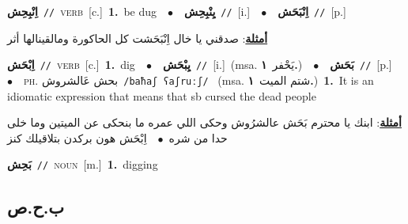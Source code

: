 \documentclass[10pt,a4paper,twoside]{article} %
\begin{document}
\begin{multicols}{2}
{{{{{{{{{{{{\setlength\topsep{0pt}\textbf{\foreignlanguage{arabic}{اِنْبِحِش}}\ {\color{gray}\texttt{//}\color{black}}\ \textsc{verb}\ [c.]\ \textbf{1.}~be dug\ \ $\bullet$\ \ \setlength\topsep{0pt}\textbf{\foreignlanguage{arabic}{يِنْبِحِش}}\ {\color{gray}\texttt{//}\color{black}}\ [i.]\ \ $\bullet$\ \ \setlength\topsep{0pt}\textbf{\foreignlanguage{arabic}{اِنْبَحَش}}\ {\color{gray}\texttt{//}\color{black}}\ [p.]\  \begin{flushright}\color{gray}\foreignlanguage{arabic}{\textbf{\underline{\foreignlanguage{arabic}{أمثلة}}}: صدقني يا خال اِنْبَحَشت كل الحاكورة ومالقينالها أثر}\end{flushright}\color{black}} \vspace{2mm}

{\setlength\topsep{0pt}\textbf{\foreignlanguage{arabic}{اِبْحَش}}\ {\color{gray}\texttt{//}\color{black}}\ \textsc{verb}\ [c.]\ \textbf{1.}~dig\ \ $\bullet$\ \ \setlength\topsep{0pt}\textbf{\foreignlanguage{arabic}{يِبْحَش}}\ {\color{gray}\texttt{//}\color{black}}\ [i.]\ \color{gray}(msa. \foreignlanguage{arabic}{يَحْفر}~\foreignlanguage{arabic}{\textbf{١.}})\color{black}\ \ $\bullet$\ \ \setlength\topsep{0pt}\textbf{\foreignlanguage{arabic}{بَحَش}}\ {\color{gray}\texttt{//}\color{black}}\ [p.]\ \ $\bullet$\ \ \textsc{ph.} \color{gray} \foreignlanguage{arabic}{بحش عَالشروش}\color{black}\ {\color{gray}\texttt{/{\sffamily baħaʃ ʕaʃruːʃ}/}\color{black}}\ \color{gray} (msa. \foreignlanguage{arabic}{شتم الميت}~\foreignlanguage{arabic}{\textbf{١.}})\color{black}\ \textbf{1.}~It is an idiomatic expression that means that sb cursed the dead people\  \begin{flushright}\color{gray}\foreignlanguage{arabic}{\textbf{\underline{\foreignlanguage{arabic}{أمثلة}}}: ابنك يا محترم بَحَش عالشرُوش وحكى اللي عمره ما بنحكى عن الميتين وما خلى حدا من شره\ $\bullet$\ \  اِبْحَش هون بركدن بتلاقيلك كنز}\end{flushright}\color{black}} \vspace{2mm}

{\setlength\topsep{0pt}\textbf{\foreignlanguage{arabic}{بَحِش}}\ {\color{gray}\texttt{//}\color{black}}\ \textsc{noun}\ [m.]\ \textbf{1.}~digging\ 

\vspace{-3mm}
\subsection*{\color{blue}\foreignlanguage{arabic}{ب.ح.ص}\color{blue}{}} 

}}}}}}}}}}}}
\end{multicols}
\end{document}
